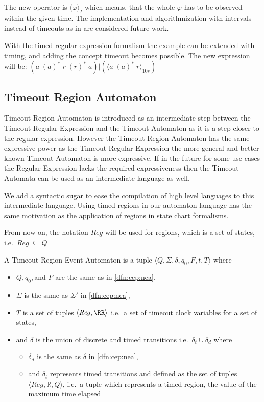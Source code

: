 	
			The new operator is $\langle \varphi \rangle_I$ which means, that the whole $\varphi$ has to be observed within the given time.	
			The implementation and algorithmization with intervals instead of timeouts as in \citep{tre} are considered future work.
	
			With the timed regular expression formalism the example can be extended with timing, and adding the concept timeout becomes possible.
			The new expression will be: $(a \; (a)^\ast \; r \; (r)^\ast \; a)|( \langle a \; (a)^\ast \; r \rangle_{10 s})$
			
			\subsection{Timeout Region Automaton}
			
			Timeout Region Automaton is introduced as an intermediate step between the Timeout Regular Expression and the Timeout Automaton as it is a step closer to the regular expression.
			However the Timeout Region Automaton has the same expressive power as the Timeout Regular Expression the more general and better known Timeout Automaton is more expressive.
			If in the future for some use cases the Regular Expression lacks the required expressiveness then the Timeout Automata can be used as an intermediate language as well.
			
			We add a syntactic sugar to ease the compilation of high level languages to this intermediate language.
			Using timed regions in our automaton language has the same motivation as the application of regions in state chart formalisms.
			
			From now on, the notation $\mathit{Reg}$ will be used for regions, which is a set of states, i.e.~$\mathit{Reg}~\subseteq~Q$
			
			
			\begin{dfn}
				\label{dfn:cep:trea}
				A Timeout Region Event Automaton is a tuple $\langle Q,\Sigma,\delta,q_0, F, t, T \rangle$ where
				\begin{itemize}
					\item $Q, q_0,$and $F$ are the same as in \cref{dfn:cep:nea},
					\item $\Sigma$ is the same as $\Sigma'$ in \cref{dfn:cep:nea}, 
					
					\item $T$ is a set of tuples $\langle \mathit{Reg}, \RR \rangle$ i.e.~a set of timeout clock variables for a set of states,
					\item and $\delta$ is the union of discrete and timed transitions i.e.~$\delta_t \cup \delta_d$ where
					\begin{itemize}
						\item $\delta_d$ is the same as $\delta$ in \cref{dfn:cep:nea},
						\item and $\delta_t$ represents timed transitions and defined as the set of tuples $\langle \mathit{Reg} , \mathbb{R} , Q \rangle$, i.e.~a tuple which represents a timed region, the value of the maximum time elapsed
					\end{itemize}
					
				\end{itemize}
			\end{dfn}
			
